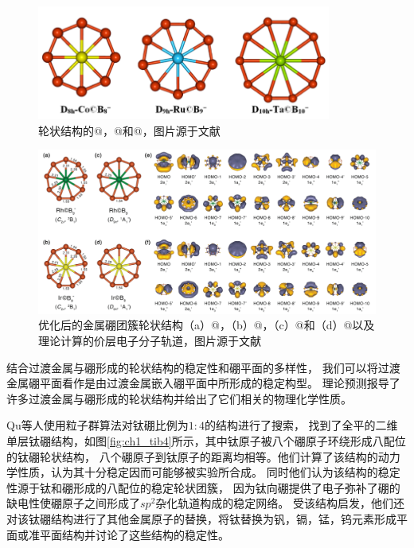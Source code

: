 \begin{figure}[bt]
  \includegraphics[width=0.86\textwidth]{figs/ch1_boron_wheel01.png}
  \centering
  \caption{轮状结构的@，@和@，图片源于文献\cite{romanescu2013transition}}
  \label{fig:ch1_boron_wheel01}
\end{figure}

\begin{figure}
  \includegraphics[width=1.0\textwidth]{figs/ch1_boron_wheel02.png}
  \centering
  \caption{优化后的金属硼团簇轮状结构（a）@，（b）@，（c）@和（d）@以及理论计算的价层电子分子轨道，图片源于文献\cite{li2012transition}}
  \label{fig:ch1_boron_wheel02}
\end{figure}


结合过渡金属与硼形成的轮状结构的稳定性和硼平面的多样性，
我们可以将过渡金属硼平面看作是由过渡金属嵌入硼平面中所形成的稳定构型。
理论预测报导了许多过渡金属与硼形成的轮状结构并给出了它们相关的物理化学性质。

Qu等人\cite{qu2017two}使用粒子群算法对钛硼比例为$1:4$的结构进行了搜索，
找到了全平的二维单层钛硼结构，如图\ref{fig:ch1_tib4}所示，其中钛原子被八个硼原子环绕形成八配位的钛硼轮状结构，
八个硼原子到钛原子的距离均相等。他们计算了该结构的动力学性质，认为其十分稳定因而可能够被实验所合成。
同时他们认为该结构的稳定性源于钛和硼形成的八配位的稳定轮状团簇，
因为钛向硼提供了电子弥补了硼的缺电性使硼原子之间形成了$sp^2$杂化轨道构成的稳定网络。
受该结构启发，他们还对该钛硼结构进行了其他金属原子的替换，将钛替换为钒，镉，锰，钨元素形成平面或准平面结构并讨论了这些结构的稳定性。

